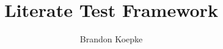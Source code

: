 \usepackage[margin=1in]{geometry}
\usepackage{noweb}
\pagestyle{noweb}
\noweboptions{}
\title{Literate Test Framework}
\author{Brandon Koepke}
